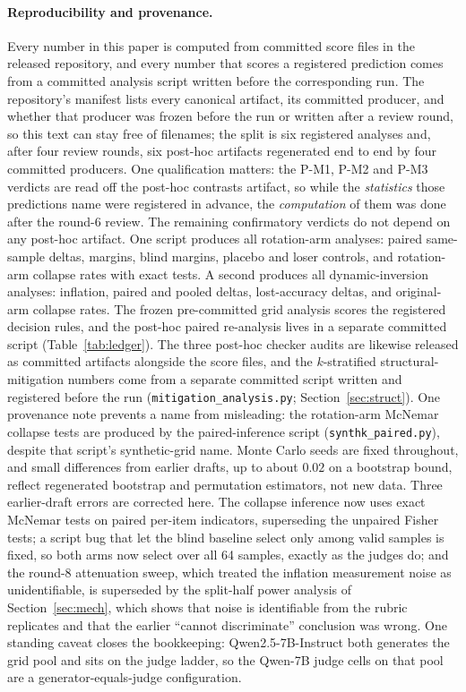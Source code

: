 \documentclass[11pt]{article}
\begin{document}
\paragraph{Reproducibility and provenance.}
Every number in this paper is computed from committed score files in the released repository, and every number that scores a registered prediction comes from a committed analysis script written before the corresponding run.
The repository's manifest lists every canonical artifact, its committed producer, and whether that producer was frozen before the run or written after a review round, so this text can stay free of filenames; the split is six registered analyses and, after four review rounds, six post-hoc artifacts regenerated end to end by four committed producers.
One qualification matters: the P-M1, P-M2 and P-M3 verdicts are read off the post-hoc contrasts artifact, so while the \emph{statistics} those predictions name were registered in advance, the \emph{computation} of them was done after the round-6 review.
The remaining confirmatory verdicts do not depend on any post-hoc artifact.
One script produces all rotation-arm analyses: paired same-sample deltas, margins, blind margins, placebo and loser controls, and rotation-arm collapse rates with exact tests.
A second produces all dynamic-inversion analyses: inflation, paired and pooled deltas, lost-accuracy deltas, and original-arm collapse rates.
The frozen pre-committed grid analysis scores the registered decision rules, and the post-hoc paired re-analysis lives in a separate committed script (Table~\ref{tab:ledger}).
The three post-hoc checker audits are likewise released as committed artifacts alongside the score files, and the $k$-stratified structural-mitigation numbers come from a separate committed script written and registered before the run (\texttt{mitigation\_analysis.py}; Section~\ref{sec:struct}).
One provenance note prevents a name from misleading: the rotation-arm McNemar collapse tests are produced by the paired-inference script (\texttt{synthk\_paired.py}), despite that script's synthetic-grid name.
Monte Carlo seeds are fixed throughout, and small differences from earlier drafts, up to about $0.02$ on a bootstrap bound, reflect regenerated bootstrap and permutation estimators, not new data.
Three earlier-draft errors are corrected here.
The collapse inference now uses exact McNemar tests on paired per-item indicators, superseding the unpaired Fisher tests; a script bug that let the blind baseline select only among valid samples is fixed, so both arms now select over all 64 samples, exactly as the judges do; and the round-8 attenuation sweep, which treated the inflation measurement noise as unidentifiable, is superseded by the split-half power analysis of Section~\ref{sec:mech}, which shows that noise is identifiable from the rubric replicates and that the earlier ``cannot discriminate'' conclusion was wrong.
One standing caveat closes the bookkeeping: Qwen2.5-7B-Instruct both generates the grid pool and sits on the judge ladder, so the Qwen-7B judge cells on that pool are a generator-equals-judge configuration.
\end{document}
